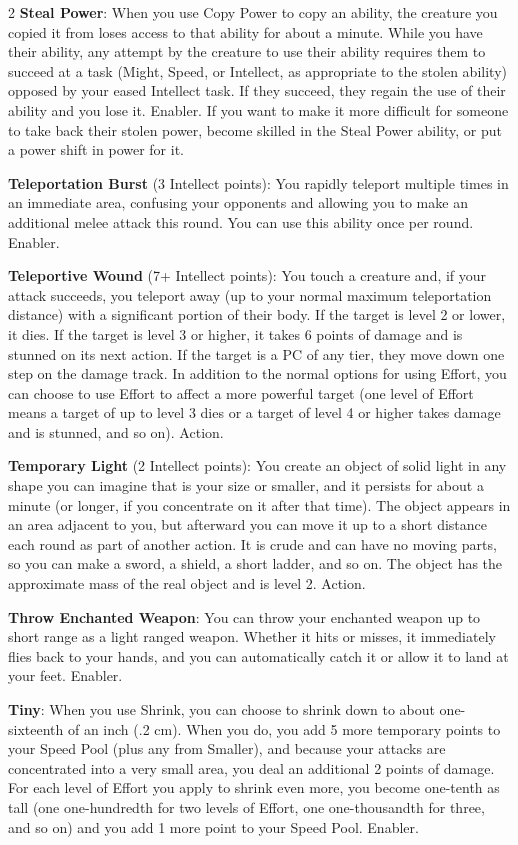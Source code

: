 \begin{multicols}{2}
\textbf{Steal Power}: When you use Copy Power to copy an ability, the creature you copied it from loses access to that ability for about a minute. While you have their ability, any attempt by the creature to use their ability requires them to succeed at a task (Might, Speed, or Intellect, as appropriate to the stolen ability) opposed by your eased Intellect task. If they succeed, they regain the use of their ability and you lose it. Enabler.
 If you want to make it more difficult for someone to take back their stolen power, become skilled in the Steal Power ability, or put a power shift in power for it.

\textbf{Teleportation Burst} (3 Intellect points): You rapidly teleport multiple times in an immediate area, confusing your opponents and allowing you to make an additional melee attack this round. You can use this ability once per round. Enabler.

\textbf{Teleportive Wound} (7+ Intellect points): You touch a creature and, if your attack succeeds, you teleport away (up to your normal maximum teleportation distance) with a significant portion of their body. If the target is level 2 or lower, it dies. If the target is level 3 or higher, it takes 6 points of damage and is stunned on its next action. If the target is a PC of any tier, they move down one step on the damage track. In addition to the normal options for using Effort, you can choose to use Effort to affect a more powerful target (one level of Effort means a target of up to level 3 dies or a target of level 4 or higher takes damage and is stunned, and so on). Action.

\textbf{Temporary Light} (2 Intellect points): You create an object of solid light in any shape you can imagine that is your size or smaller, and it persists for about a minute (or longer, if you concentrate on it after that time). The object appears in an area adjacent to you, but afterward you can move it up to a short distance each round as part of another action. It is crude and can have no moving parts, so you can make a sword, a shield, a short ladder,
and so on. The object has the approximate mass of the real object and is level 2. Action.

\textbf{Throw Enchanted Weapon}: You can throw your enchanted weapon up to short range as a light ranged weapon. Whether it hits or misses, it immediately flies back to your hands, and you can automatically catch it or allow it to land at your feet. Enabler.

\textbf{Tiny}: When you use Shrink, you can choose to shrink down to about one-sixteenth of an inch (.2 cm). When you do, you add 5 more temporary points to your Speed Pool (plus any from Smaller), and because your attacks are concentrated into a very small area, you deal an additional 2 points of damage. For each level of Effort you apply to shrink even more, you become one-tenth as tall (one one-hundredth for two levels of Effort, one one-thousandth for three, and so on) and you add 1 more point to your Speed Pool. Enabler.


\end{multicols}
